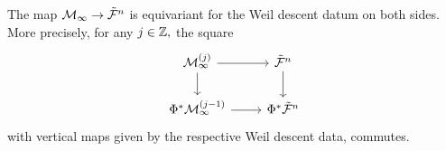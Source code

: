 \documentclass[../main.tex]{subfiles}
\begin{document}
\begin{lem}\label{lem:EquivarianceForWeilDD}
    The map $\mathcal{M}_\infty \to \tilde {\mathcal{F}}^n$ is equivariant
    for the Weil descent datum on both sides. More precisely,
    for any $j \in \mathbb{Z},$ the square
    \begin{equation*}
        \begin{tikzcd}[ampersand replacement=\&]
        	{\cM_\infty^{(j)}} \& {\tilde \cF^n} \\
        	{\Phi^*\cM_\infty^{(j-1)}} \& {\Phi^*\tilde \cF^n}
        	\arrow[from=1-1, to=1-2]
        	\arrow[from=1-1, to=2-1]
        	\arrow[from=1-2, to=2-2]
        	\arrow[from=2-1, to=2-2]
        \end{tikzcd}
    \end{equation*}
    with vertical maps given by the respective Weil descent data,
    commutes.
\end{lem}
\end{document}
